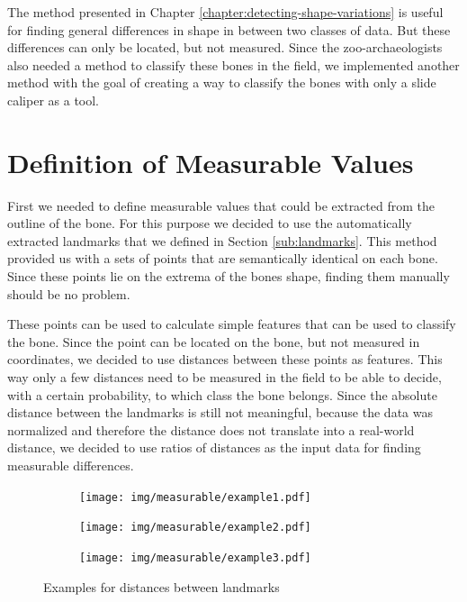 \documentclass[pdftex,12pt,a4paper]{report}
\begin{document}
The method presented in Chapter \ref{chapter:detecting-shape-variations} is useful for finding general differences in shape in between two classes of data. But these differences can only be located, but not measured. Since the zoo-archaeologists also needed a method to classify these bones in the field, we implemented another method with the goal of creating a way to classify the bones with only a slide caliper as a tool.

\section{Definition of Measurable Values}

First we needed to define measurable values that could be extracted from the outline of the bone. For this purpose we decided to use the automatically extracted landmarks that we defined in Section \ref{sub:landmarks}. This method provided us with a sets of points that are semantically identical on each bone. Since these points lie on the extrema of the bones shape, finding them manually should be no problem.

These points can be used to calculate simple features that can be used to classify the bone. Since the point can be located on the bone, but not measured in coordinates, we decided to use distances between these points as features. This way only a few distances need to be measured in the field to be able to decide, with a certain probability, to which class the bone belongs. Since the absolute distance between the landmarks is still not meaningful, because the data was normalized and therefore the distance does not translate into a real-world distance, we decided to use ratios of distances as the input data for finding measurable differences.

\begin{figure}[h]
	\centering
	\begin{subfigure}[b]{0.25\textwidth}
		\centering
		\texttt{[image: img/measurable/example1.pdf]}
	\end{subfigure}
	\begin{subfigure}[b]{0.25\textwidth}
		\centering
		\texttt{[image: img/measurable/example2.pdf]}
	\end{subfigure}
	\begin{subfigure}[b]{0.25\textwidth}
		\centering
		\texttt{[image: img/measurable/example3.pdf]}
	\end{subfigure}
	\caption{Examples for distances between landmarks}
	\label{fig:measurable-distances}
\end{figure}
\end{document}
